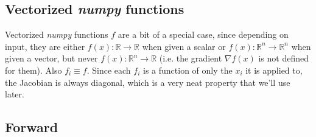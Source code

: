 \documentclass[paper=a4,11pt,headsepline]{scrartcl}
\newcommand{\ve}[1]{\ensuremath{\bm{\mathit{#1}}}}
\newcommand{\ra}{\ensuremath{\rightarrow}}
\newcommand{\soft}[1]{\textsl{#1}\xspace}
\newcommand{\numpy}{\soft{numpy}}
\begin{document}
\subsection{Vectorized \numpy functions}

Vectorized \numpy functions $f$ are a bit of a special case, since depending on
input, they are either $f(x):\mathbb R\ra\mathbb R$ when given a scalar or $\ve
f(\ve x):\mathbb R^n\ra\mathbb R^n$ when given a vector, but never $f(\ve x):
\mathbb R^n \ra \mathbb R$ (i.e. the gradient $\nabla f(\ve x)$ is not defined
for them). Also $f_i\equiv f$. Since each $f_i$ is a function of only the $x_i$
it is applied to, the Jacobian is always diagonal, which is a very neat
property that we'll use later.

\subsection{Forward}
\end{document}
